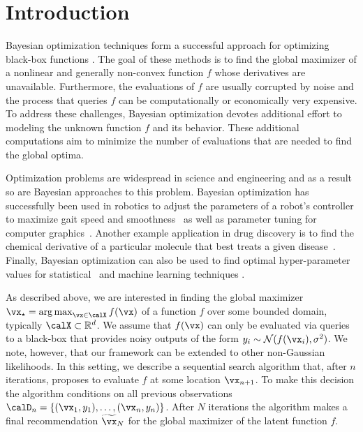 
\section{Introduction}

Bayesian optimization techniques form a successful 
approach for optimizing black-box functions \cite{Brochu:2009}. The goal
of these methods is to find the global maximizer of a nonlinear and generally non-convex function $f$
whose derivatives are unavailable. Furthermore, the evaluations of $f$ are usually corrupted by noise and
the process that queries $f$ can be computationally or economically very expensive. To address these challenges,
Bayesian optimization devotes additional effort to modeling the unknown function $f$ and its behavior.
These additional computations aim to minimize the number of evaluations that are needed to find the global optima.

Optimization problems are widespread in science and engineering and as a result
so are Bayesian approaches to this problem.  Bayesian optimization has
successfully been used in robotics to adjust the parameters of a robot's
controller to maximize gait speed and smoothness~\citep{Lizotte:2007} as well as
parameter tuning for computer graphics~\cite{Brochu:2007}. Another example
application in drug discovery is to find the chemical derivative of a particular
molecule that best treats a given disease~\cite{negoescu:2011}.  Finally,
Bayesian optimization can also be used to find optimal hyper-parameter values
for statistical~\cite{Wang:2013} and machine learning techniques
\citep{Snoek:2012}.

As described above, we are interested in finding the global maximizer $\xopt=\argmax_{\x\in\X} f(\x)$
of a function $f$ over some bounded domain, typically $\X\subset\R^d$. We 
assume that $f(\x)$ can only be evaluated via queries to a black-box that
provides noisy outputs of the form $y_i\sim \Normal(f(\x_i), \sigma^2)$. We
note, however, that our framework can be extended to other non-Gaussian
likelihoods. In this setting, we describe a sequential search algorithm that,
after $n$ iterations, proposes to evaluate $f$ at some location $\x_{n+1}$. To
make this decision the algorithm conditions on all previous observations
$\D_n=\{(\x_1,y_1),\dots,(\x_n,y_n)\}$. After $N$ iterations the algorithm 
makes a final recommendation $\xrec_N$ for the global maximizer of the latent function $f$.  

